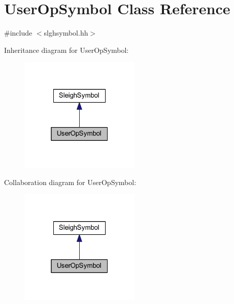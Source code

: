 \hypertarget{class_user_op_symbol}{}\section{User\+Op\+Symbol Class Reference}
\label{class_user_op_symbol}


{\ttfamily \#include $<$slghsymbol.\+hh$>$}



Inheritance diagram for User\+Op\+Symbol\+:
\nopagebreak
\begin{figure}[H]
\begin{center}
\leavevmode
\includegraphics[width=163pt]{class_user_op_symbol__inherit__graph}
\end{center}
\end{figure}


Collaboration diagram for User\+Op\+Symbol\+:
\nopagebreak
\begin{figure}[H]
\begin{center}
\leavevmode
\includegraphics[width=163pt]{class_user_op_symbol__coll__graph}
\end{center}
\end{figure}

